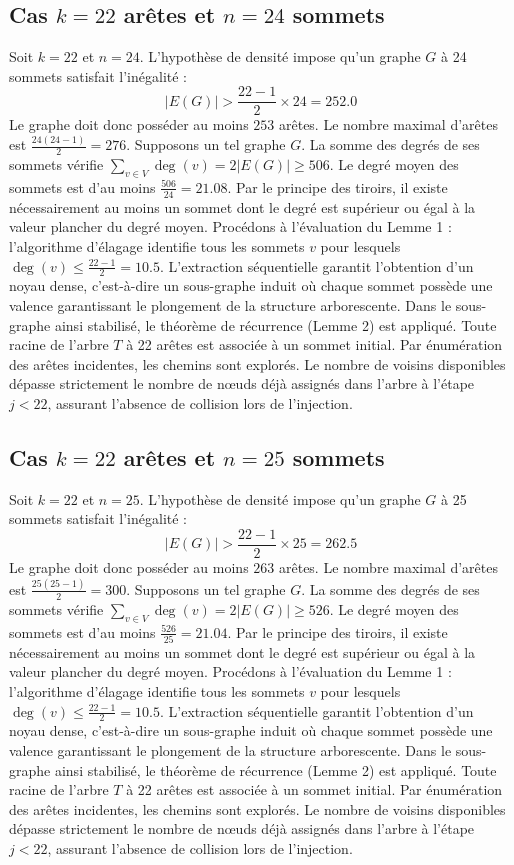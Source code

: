 \documentclass[12pt,a4paper]{article}
\begin{document}
\subsection{Cas $k = 22$ arêtes et $n = 24$ sommets}
Soit $k = 22$ et $n = 24$. L'hypothèse de densité impose qu'un graphe $G$ à 24 sommets satisfait l'inégalité :
$$ |E(G)| > \frac{22-1}{2} \times 24 = 252.0 $$
Le graphe doit donc posséder au moins $253$ arêtes. Le nombre maximal d'arêtes est $\frac{24(24-1)}{2} = 276$.
Supposons un tel graphe $G$. La somme des degrés de ses sommets vérifie $\sum_{v \in V} \deg(v) = 2|E(G)| \geq 506$.
Le degré moyen des sommets est d'au moins $\frac{506}{24} = 21.08$.
Par le principe des tiroirs, il existe nécessairement au moins un sommet dont le degré est supérieur ou égal à la valeur plancher du degré moyen.
Procédons à l'évaluation du Lemme 1 : l'algorithme d'élagage identifie tous les sommets $v$ pour lesquels $\deg(v) \leq \frac{22-1}{2} = 10.5$.
L'extraction séquentielle garantit l'obtention d'un noyau dense, c'est-à-dire un sous-graphe induit où chaque sommet possède une valence garantissant le plongement de la structure arborescente.
Dans le sous-graphe ainsi stabilisé, le théorème de récurrence (Lemme 2) est appliqué. Toute racine de l'arbre $T$ à 22 arêtes est associée à un sommet initial. Par énumération des arêtes incidentes, les chemins sont explorés. Le nombre de voisins disponibles dépasse strictement le nombre de nœuds déjà assignés dans l'arbre à l'étape $j < 22$, assurant l'absence de collision lors de l'injection.

\subsection{Cas $k = 22$ arêtes et $n = 25$ sommets}
Soit $k = 22$ et $n = 25$. L'hypothèse de densité impose qu'un graphe $G$ à 25 sommets satisfait l'inégalité :
$$ |E(G)| > \frac{22-1}{2} \times 25 = 262.5 $$
Le graphe doit donc posséder au moins $263$ arêtes. Le nombre maximal d'arêtes est $\frac{25(25-1)}{2} = 300$.
Supposons un tel graphe $G$. La somme des degrés de ses sommets vérifie $\sum_{v \in V} \deg(v) = 2|E(G)| \geq 526$.
Le degré moyen des sommets est d'au moins $\frac{526}{25} = 21.04$.
Par le principe des tiroirs, il existe nécessairement au moins un sommet dont le degré est supérieur ou égal à la valeur plancher du degré moyen.
Procédons à l'évaluation du Lemme 1 : l'algorithme d'élagage identifie tous les sommets $v$ pour lesquels $\deg(v) \leq \frac{22-1}{2} = 10.5$.
L'extraction séquentielle garantit l'obtention d'un noyau dense, c'est-à-dire un sous-graphe induit où chaque sommet possède une valence garantissant le plongement de la structure arborescente.
Dans le sous-graphe ainsi stabilisé, le théorème de récurrence (Lemme 2) est appliqué. Toute racine de l'arbre $T$ à 22 arêtes est associée à un sommet initial. Par énumération des arêtes incidentes, les chemins sont explorés. Le nombre de voisins disponibles dépasse strictement le nombre de nœuds déjà assignés dans l'arbre à l'étape $j < 22$, assurant l'absence de collision lors de l'injection.
\end{document}
